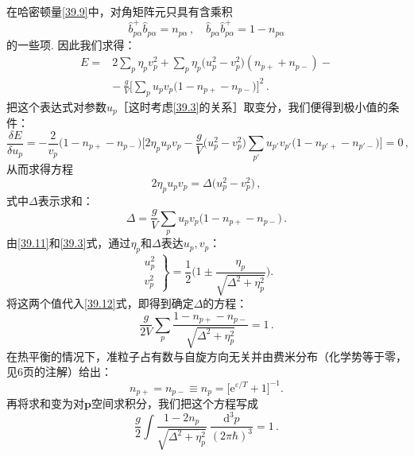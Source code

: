 在哈密顿量\eqref{39.9}中，对角矩阵元只具有含乘积
\begin{equation*}
\hat b^{+}_{p\alpha}\hat b_{p\alpha} = n_{p\alpha}\,,\quad \hat b_{p\alpha}\hat b^{+}_{p\alpha} = 1 - n_{p\alpha}
\end{equation*}
的一些项. 因此我们求得：
\begin{equation}
\begin{aligned}
E ={}& 2\sum_p\eta_p v_p^2 + \sum_p\eta_p\bigl(u_p^2 - v_p^2\bigr)(n_{p+} + n_{p-}) - {}\\
&-\ \frac{g}{V}\Biggl[\sum_p u_pv_p\bigl(1 - n_{p+} - n_{p-}\bigr)\Biggr]^2\,.
\end{aligned}
\label{39.10}
\end{equation}
把这个表达式对参数$u_p$［这时考虑\eqref{39.3}的关系］取变分，我们便得到极小值的条件：
\begin{equation*}
\frac{\delta E}{\delta u_p} = -\frac{2}{v_p}\bigl(1 - n_{p+} - n_{p-}\bigr)\Biggl[2\eta_pu_pv_p
- \frac{g}{V}\bigl(u_p^2 - v_p^2\bigr)\sum_{p'}u_{p'}v_{p'}\bigl(1 - n_{p'+} - n_{p'-}\bigr)\Biggr] = 0\,,
\end{equation*}
从而求得方程
\begin{equation}
2\eta_pu_pv_p = \Delta\bigl(u_p^2 - v_p^2\bigr)\,,
\label{39.11}
\end{equation}
式中$\Delta$表示求和：
\begin{equation}
\Delta = \frac{g}{V}\sum_p u_pv_p\bigl(1 - n_{p+} - n_{p-}\bigr)\,.
\label{39.12}
\end{equation}
由\eqref{39.11}和\eqref{39.3}式，通过$\eta_p$和$\Delta$表达$u_p,v_p$：
\begin{equation}
\left.\begin{matrix} u_p^2 \\ v_p^2 \end{matrix}\right\}
= \frac{1}{2}\Biggl(1 \pm \frac{\eta_p}{\sqrt{\Delta^2 + \eta_p^2}}\Biggr).
\label{39.13}
\end{equation}
将这两个值代入\eqref{39.12}式，即得到确定$\Delta$的方程：
\begin{equation*}
\frac{g}{2V}\sum_p\frac{1 - n_{p+} - n_{p-}}{\sqrt{\Delta^2 + \eta_p^2}} = 1\,.
\end{equation*}
在热平衡的情况下，准粒子占有数与自旋方向无关并由费米分布（化学势等于零，见6页的注解）给出：
\begin{equation}
n_{p+} = n_{p-} \equiv n_p = \bigl[\mathrm e^{\varepsilon/T} + 1\bigr]^{-1}.
\label{39.14}
\end{equation}
再将求和变为对$\bm p$空间求积分，我们把这个方程写成
\begin{equation}
\frac{g}{2}\int\frac{1 - 2n_p}{\sqrt{\Delta^2 + \eta_p^2}}\ \frac{\mathrm d^3p}{(2\pi\hbar)^3} = 1\,.
\label{39.15}
\end{equation}

